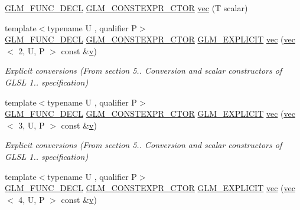 \begin{DoxyCompactItemize}
\item 
\hyperlink{setup_8hpp_ab2d052de21a70539923e9bcbf6e83a51}{G\+L\+M\+\_\+\+F\+U\+N\+C\+\_\+\+D\+E\+CL} \hyperlink{setup_8hpp_ad34178a09666081abdb573c14d1f4a5a}{G\+L\+M\+\_\+\+C\+O\+N\+S\+T\+E\+X\+P\+R\+\_\+\+C\+T\+OR} \hyperlink{structglm_1_1vec_3_011_00_01_t_00_01_q_01_4_a37e46740c8de9a5cf779508b05114859}{vec} (T scalar)
\item 
{\footnotesize template$<$typename U , qualifier P$>$ }\\\hyperlink{setup_8hpp_ab2d052de21a70539923e9bcbf6e83a51}{G\+L\+M\+\_\+\+F\+U\+N\+C\+\_\+\+D\+E\+CL} \hyperlink{setup_8hpp_ad34178a09666081abdb573c14d1f4a5a}{G\+L\+M\+\_\+\+C\+O\+N\+S\+T\+E\+X\+P\+R\+\_\+\+C\+T\+OR} \hyperlink{setup_8hpp_a6c74f5a5e7b134ab69023ff9a30d4d5d}{G\+L\+M\+\_\+\+E\+X\+P\+L\+I\+C\+IT} \hyperlink{structglm_1_1vec_3_011_00_01_t_00_01_q_01_4_a48714830341cbda646b425d42ae72314}{vec} (\hyperlink{structglm_1_1vec}{vec}$<$ 2, U, P $>$ const \&\hyperlink{_s_d_l__opengl_8h_a10a82eabcb59d2fcd74acee063775f90}{v})
\begin{DoxyCompactList}\small\item\em Explicit conversions (From section 5.. Conversion and scalar constructors of G\+L\+SL 1.. specification) \end{DoxyCompactList}\item 
{\footnotesize template$<$typename U , qualifier P$>$ }\\\hyperlink{setup_8hpp_ab2d052de21a70539923e9bcbf6e83a51}{G\+L\+M\+\_\+\+F\+U\+N\+C\+\_\+\+D\+E\+CL} \hyperlink{setup_8hpp_ad34178a09666081abdb573c14d1f4a5a}{G\+L\+M\+\_\+\+C\+O\+N\+S\+T\+E\+X\+P\+R\+\_\+\+C\+T\+OR} \hyperlink{setup_8hpp_a6c74f5a5e7b134ab69023ff9a30d4d5d}{G\+L\+M\+\_\+\+E\+X\+P\+L\+I\+C\+IT} \hyperlink{structglm_1_1vec_3_011_00_01_t_00_01_q_01_4_ab2af72d32392be4ad056d846d6552a85}{vec} (\hyperlink{structglm_1_1vec}{vec}$<$ 3, U, P $>$ const \&\hyperlink{_s_d_l__opengl_8h_a10a82eabcb59d2fcd74acee063775f90}{v})
\begin{DoxyCompactList}\small\item\em Explicit conversions (From section 5.. Conversion and scalar constructors of G\+L\+SL 1.. specification) \end{DoxyCompactList}\item 
{\footnotesize template$<$typename U , qualifier P$>$ }\\\hyperlink{setup_8hpp_ab2d052de21a70539923e9bcbf6e83a51}{G\+L\+M\+\_\+\+F\+U\+N\+C\+\_\+\+D\+E\+CL} \hyperlink{setup_8hpp_ad34178a09666081abdb573c14d1f4a5a}{G\+L\+M\+\_\+\+C\+O\+N\+S\+T\+E\+X\+P\+R\+\_\+\+C\+T\+OR} \hyperlink{setup_8hpp_a6c74f5a5e7b134ab69023ff9a30d4d5d}{G\+L\+M\+\_\+\+E\+X\+P\+L\+I\+C\+IT} \hyperlink{structglm_1_1vec_3_011_00_01_t_00_01_q_01_4_afe3da36b0ef8bf292c65f2846dc6db9a}{vec} (\hyperlink{structglm_1_1vec}{vec}$<$ 4, U, P $>$ const \&\hyperlink{_s_d_l__opengl_8h_a10a82eabcb59d2fcd74acee063775f90}{v})

\end{DoxyCompactItemize}
